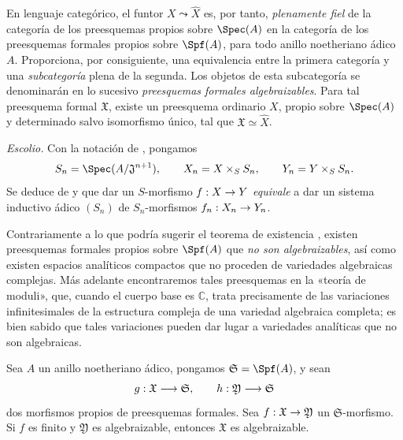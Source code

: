 \documentclass[oneside]{amsart}
\makeatletter
\newcommand{\ega@arrow}[2]{\mathchoice{#1}{#2}{#2}{#2}}
\renewcommand{\to}{\ega@arrow{\longrightarrow}{\rightarrow}}
\let\EGAOriginalLabel\label
\renewcommand{\label}[1]{\phantomsection\EGAOriginalLabel{#1}}
\makeatother
\begin{document}
En lenguaje categórico, el funtor
$X\leadsto\widehat{X}$ es, por tanto, \emph{plenamente fiel}
 de la categoría de los preesquemas propios sobre
$\Spec(A)$ en la categoría de los preesquemas formales propios sobre
$\Spf(A)$, para todo anillo noetheriano ádico $A$. Proporciona, por
consiguiente, una equivalencia entre la primera categoría y una
\emph{subcategoría} plena de la segunda. Los objetos de esta subcategoría se
denominarán en lo sucesivo \emph{preesquemas formales algebraizables}.
Para tal preesquema formal $\mathfrak{X}$, existe un preesquema
ordinario $X$, propio sobre $\Spec(A)$ y determinado salvo isomorfismo
único, tal que $\mathfrak{X}\simeq\widehat{X}$.

\begin{env}[5.4.2]
\label{III.5.4.2}
\emph{Escolio.}
Con la notación de , pongamos
\[
  S_n=\Spec(A/\mathfrak{J}^{n+1}),\qquad
  X_n=X\times_S S_n,\qquad
  Y_n=Y\times_S S_n.
\]
Se deduce de  y  que
dar un $S$-morfismo $f:X\to Y$ \emph{equivale} a dar un sistema inductivo
ádico $(S_n)$  de
$S_n$-morfismos $f_n:X_n\to Y_n$.
\end{env}

\begin{remark}[5.4.3]
\label{III.5.4.3}
Contrariamente a lo que podría sugerir el teorema de existencia
, existen preesquemas formales propios sobre $\Spf(A)$
que \emph{no son algebraizables}, así como existen espacios analíticos
compactos que no proceden de variedades algebraicas complejas. Más
adelante encontraremos tales preesquemas en la «teoría de moduli»,
que, cuando el cuerpo base es $\mathbb{C}$, trata precisamente de las
variaciones infinitesimales de la estructura compleja de una variedad
algebraica completa; es bien sabido que tales variaciones pueden dar
lugar a variedades analíticas que no son algebraicas.
\end{remark}

\begin{proposition}[5.4.4]
\label{III.5.4.4}
Sea $A$ un anillo noetheriano ádico, pongamos
$\mathfrak{S}=\Spf(A)$, y sean
\[
  g:\mathfrak{X}\to\mathfrak{S},
  \qquad
  h:\mathfrak{Y}\to\mathfrak{S}
\]
dos morfismos propios de preesquemas formales. Sea
$f:\mathfrak{X}\to\mathfrak{Y}$ un
$\mathfrak{S}$-morfismo. Si $f$ es finito y
$\mathfrak{Y}$ es algebraizable, entonces $\mathfrak{X}$ es
algebraizable.
\end{proposition}
\end{document}
